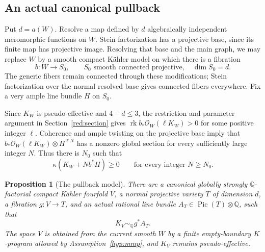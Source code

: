 \documentclass[11pt,letterpaper]{article}
\newcommand{\Q}{\mathbb{Q}}
\newcommand{\OO}{\mathcal{O}}
\DeclareMathOperator{\Pic}{Pic}
\DeclareMathOperator{\rk}{rk}
\newtheorem{proposition}[theorem]{Proposition}
\theoremstyle{definition}
\theoremstyle{remark}
\begin{document}
\subsection{An actual canonical pullback}

Put \(d=a(W)\). Resolve a map defined by \(d\) algebraically independent
meromorphic functions on \(W\). Stein factorization has a projective
base, since its finite map has projective image. Resolving that base
and the main graph, we may replace \(W\) by a smooth compact Kähler
model on which there is a fibration
\[
 b:W\longrightarrow S_0,
 \qquad S_0\text{ smooth connected projective},\quad\dim S_0=d.
\]
The generic fibers remain connected through these modifications; Stein
factorization over the normal resolved base gives connected fibers
everywhere. Fix a very ample line bundle \(H\) on \(S_0\).

Since \(K_W\) is pseudo-effective and \(4-d\leq3\), the restriction
and parameter argument in Section~\ref{red:section} gives
\(\rk b_*\OO_W(\ell K_W)>0\) for some positive integer \(\ell\).
Coherence and ample twisting on the projective base imply that
\(b_*\OO_W(\ell K_W)\otimes H^{\ell N}\) has a nonzero global
section for every sufficiently large integer \(N\). Thus there is
\(N_0\) such that
\begin{equation}\label{pos:all-large-twists}
 \kappa(K_W+Nb^*H)\geq0
 \qquad\text{for every integer }N\geq N_0.
\end{equation}

\begin{proposition}[The pullback model]\label{pos:pullback-model}
There are a canonical globally strongly \(\Q\)-factorial compact
Kähler fourfold \(V\), a normal projective variety \(T\) of dimension
\(d\), a fibration \(g:V\to T\), and an actual rational line bundle
\(A_T\in\Pic(T)\otimes\Q\), such that
\begin{equation}\label{pos:canonical-pullback}
 K_V\sim_{\Q}g^*A_T.
\end{equation}
The space \(V\) is obtained from the current smooth \(W\) by a finite
empty-boundary \(K\)-program allowed by Assumption~\ref{hyp:mmp}, and
\(K_V\) remains pseudo-effective.
\end{proposition}
\end{document}
